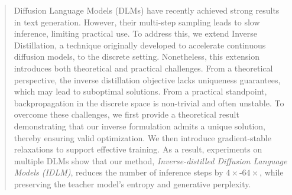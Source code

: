 
\begin{abstract}
  Diffusion Language Models (DLMs) have recently achieved strong results in text generation. However, their multi-step sampling leads to slow inference, limiting practical use. To address this, we extend Inverse Distillation, a technique originally developed to accelerate continuous diffusion models, to the discrete setting.
  Nonetheless, this extension introduces both theoretical and practical challenges. From a theoretical perspective, the inverse distillation objective lacks uniqueness guarantees, which may lead to suboptimal solutions. From a practical standpoint, backpropagation in the discrete space is non-trivial and often unstable. To overcome these challenges, we first provide a theoretical result demonstrating that our inverse formulation admits a unique solution, thereby ensuring valid optimization. We then introduce gradient-stable relaxations to support effective training. 
  As a result, experiments on multiple DLMs show that our method, \textit{Inverse-distilled Diffusion Language Models (IDLM)}, reduces the number of inference steps by $4 \times$-$64 \times$, while preserving the teacher model’s entropy and generative perplexity.
  \vspace{-5mm}
\end{abstract}

